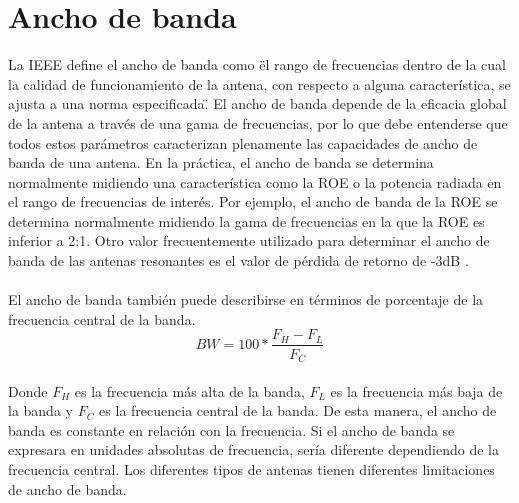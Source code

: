 \documentclass[12pt,letterpaper]{article}
\begin{document}


\newpage
\tableofcontents
\listoffigures
\listoftables


\newpage
\section{Ancho de banda}
La IEEE define el ancho de banda como \"el rango de frecuencias dentro de la cual la 
calidad de funcionamiento de la antena, con respecto a alguna característica, se ajusta 
a una norma especificada\".  El ancho de banda depende de la eficacia global de la antena 
a través de una gama de frecuencias, por lo que debe entenderse que todos estos parámetros 
caracterizan plenamente las capacidades de ancho de banda de una antena. En la práctica, 
el ancho de banda se determina normalmente midiendo una característica como la ROE o la 
potencia radiada en el rango de frecuencias de interés. Por ejemplo, el ancho de banda de 
la ROE se determina normalmente midiendo la gama de frecuencias en la que la ROE es 
inferior a 2:1. Otro valor frecuentemente utilizado para determinar el ancho de banda de 
las antenas resonantes es el valor de pérdida de retorno de -3dB \cite{anchobanda}. 
\\ \\
El ancho de banda también puede describirse en términos de porcentaje de la frecuencia 
central de la banda.
\begin{equation}
    BW=100 * \frac{F_H-F_L}{F_C}
\end{equation}
\\
Donde $F_H$ es la frecuencia más alta de la banda, $F_L$ es la frecuencia más baja de 
la banda y $F_C$ es la frecuencia central de la banda. De esta manera, el ancho de banda 
es constante en relación con la frecuencia. Si el ancho de banda se expresara en unidades 
absolutas de frecuencia, sería diferente dependiendo de la frecuencia central. Los 
diferentes tipos de antenas tienen diferentes limitaciones de ancho de banda. 
\end{document}
